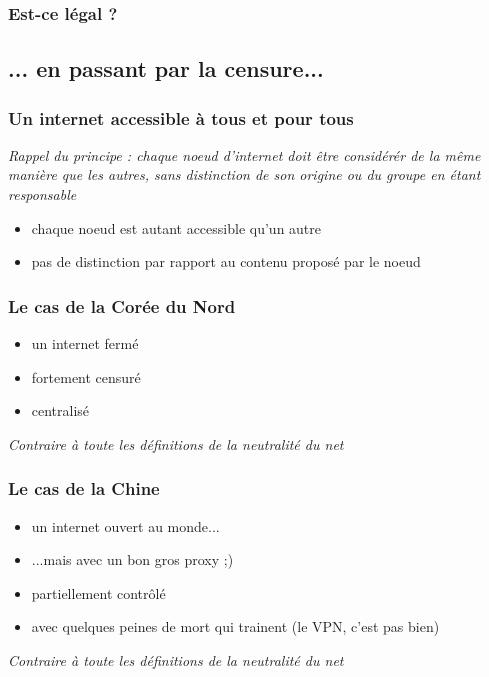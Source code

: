 \begin{frame}\frametitle{Est-ce légal ?}
\end{frame}


\subsection{... en passant par la censure...}
\begin{frame}\frametitle{Un internet accessible à tous et pour tous}
    \emph{Rappel du principe : chaque noeud d'internet doit être considérér de
        la même manière que les autres, sans distinction de son origine ou du
    groupe en étant responsable}

    \vspace{1em}

    \begin{itemize}
        \item chaque noeud est autant accessible qu'un autre
        \item pas de distinction par rapport au contenu proposé par le noeud
    \end{itemize}
\end{frame}


\begin{frame}\frametitle{Le cas de la Corée du Nord}
    \begin{itemize}
        \item un internet fermé
        \item fortement censuré
        \item centralisé
    \end{itemize}

    \vspace{1em}

    \color{red}\emph{Contraire à toute les définitions de la neutralité du net}
\end{frame}


\begin{frame}\frametitle{Le cas de la Chine}
    \begin{itemize}
        \item un internet ouvert au monde...
        \item ...mais avec un bon gros proxy ;)
        \item partiellement contrôlé
        \item avec quelques peines de mort qui trainent (le VPN, c'est pas bien)
    \end{itemize}

    \color{red}\emph{Contraire à toute les définitions de la neutralité du net}
\end{frame}


